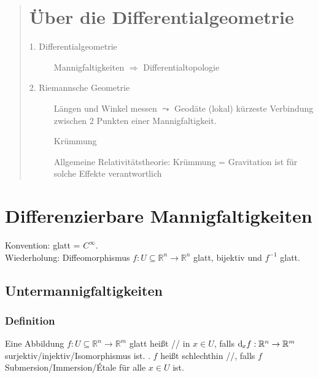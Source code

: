 
\newcommand{\fach}{Differentialgeometrie \RM{1}.}
\newcommand{\semester}{WiSe 2014}
\newcommand{\homepage}{https://wwwmath.uni-muenster.de/u/frederik.witt/diffgeoI.html}
\newcommand{\prof}{Frederik Witt}
\newcommand{\verfasser}{Arne Grauer}




\maketitle
\begin{abstract}

\section*{Über die Differentialgeometrie}
\begin{description}
	\item[1. Differentialgeometrie] Mannigfaltigkeiten $\Rightarrow $ Differentialtopologie
	\item[2. Riemannsche Geometrie] Längen und Winkel messen $\leadsto$ Geodäte (lokal) kürzeste Verbindung zwischen 2 Punkten einer Mannigfaltigkeit.
	
	Krümmung
	
	Allgemeine Relativitätstheorie: Krümmung = Gravitation ist für solche Effekte verantwortlich
\end{description}
\end{abstract}

\setcounter{page}{1}
\tableofcontents
\cleardoubleoddemptypage
{}
\setcounter{page}{1}


\section{Differenzierbare Mannigfaltigkeiten} %
\label{sec:1}
Konvention: glatt = $C^\infty$.\\
Wiederholung: Diffeomorphismus $f : U \subseteq \mathds{R}^n \to \mathds{R}^n$ glatt, bijektiv und $f ^{-1}$ glatt.

\subsection{Untermannigfaltigkeiten} %
\label{sub:11}

\subsubsection[Definition: Submersion, Immersion und Étale]{Definition} %
\label{ssub:111}
Eine Abbildung $f : U \subseteq \mathds{R}^n \to \mathds{R}^m$ glatt heißt // in $x \in U$, falls
$\mathrm{d}\mkern-1.0mu_x f : \mathbb{R}^n \to \mathbb{R}^m$ surjektiv/injektiv/Isomorphismus ist. . $f$ heißt schlechthin
//, falls $f$ Submersion/Immersion/Étale für alle $x \in U$ ist.

